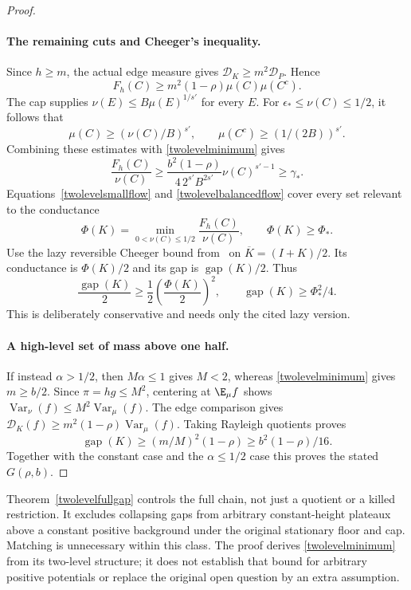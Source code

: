 \begin{proof}
\paragraph{The remaining cuts and Cheeger's inequality.}
Since $h\geq m$, the actual edge measure gives
$\mathcal D_K\geq m^2\mathcal D_P$. Hence
\[
 F_h(C)\geq m^2(1-\rho)\mu(C)\mu(C^c).
\]
The cap supplies $\nu(E)\leq B\mu(E)^{1/s'}$ for every $E$.
For $\epsilon_*\leq\nu(C)\leq1/2$, it follows that
\[
 \mu(C)\geq(\nu(C)/B)^{s'},\qquad
 \mu(C^c)\geq(1/(2B))^{s'}.
\]
Combining these estimates with \eqref{twolevelminimum} gives
\begin{equation}\label{twolevelbalancedflow}
 \frac{F_h(C)}{\nu(C)}
 \geq\frac{b^2(1-\rho)}{4\,2^{s'}B^{2s'}}\nu(C)^{s'-1}
 \geq\gamma_*.
\end{equation}
Equations~\eqref{twolevelsmallflow} and \eqref{twolevelbalancedflow}
cover every set relevant to the conductance
\[
 \Phi(K)=\min_{0<\nu(C)\leq1/2}\frac{F_h(C)}{\nu(C)},
 \qquad \Phi(K)\geq\Phi_*.
\]
Use the lazy reversible Cheeger bound from~\cite{peres} on
$\overline K=(I+K)/2$. Its conductance is $\Phi(K)/2$ and its gap is
$\operatorname{gap}(K)/2$. Thus
\[
 \frac{\operatorname{gap}(K)}2
 \geq\frac12\left(\frac{\Phi(K)}2\right)^2,
 \qquad \operatorname{gap}(K)\geq\Phi_*^2/4.
\]
This is deliberately conservative and needs only the cited lazy version.

\paragraph{A high-level set of mass above one half.}
If instead $\alpha>1/2$, then $M\alpha\leq1$ gives $M<2$, whereas
\eqref{twolevelminimum} gives $m\geq b/2$. Since $\pi=hg\leq M^2$,
centering at $\E_\mu f$ shows
$\operatorname{Var}_\nu(f)\leq M^2\operatorname{Var}_\mu(f)$.
The edge comparison gives
$\mathcal D_K(f)\geq m^2(1-\rho)\operatorname{Var}_\mu(f)$.
Taking Rayleigh quotients proves
\[
 \operatorname{gap}(K)\geq(m/M)^2(1-\rho)
                      \geq b^2(1-\rho)/16.
\]
Together with the constant case and the $\alpha\leq1/2$ case this proves
the stated $G(\rho,b)$.
\end{proof}

Theorem~\ref{twolevelfullgap} controls the full chain, not just a quotient
or a killed restriction. It excludes collapsing gaps from arbitrary
constant-height plateaux above a constant positive background under the
original stationary floor and cap. Matching is unnecessary within this
class. The proof derives \eqref{twolevelminimum} from its two-level
structure; it does not establish that bound for arbitrary positive
potentials or replace the original open question by an extra assumption.
